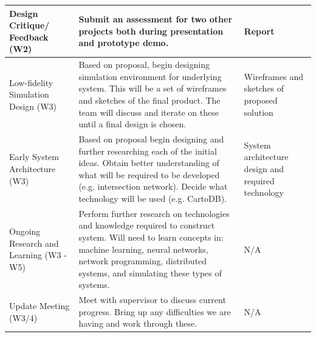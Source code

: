 \documentclass{report}
\begin{document}
\begin{longtable}[htbp] {| P{2.5cm} | P{10cm} | P{2.5cm} |}
    Design Critique/ Feedback (W2)             & Submit an assessment for two other projects both during presentation and prototype demo.                                                                                                                                                                                                                                                                                                   & Report                                             \\ \hline
    Low-fidelity Simulation Design (W3)        & Based on proposal, begin designing simulation environment for underlying system. This will be a set of wireframes and sketches of the final product. The team will discuss and iterate on these until a final design is chosen.                                                                                                                                                             & Wireframes and sketches of proposed solution       \\ \hline
    Early System Architecture (W3)             & Based on proposal begin designing and further researching each of the initial ideas. Obtain better understanding of what will be required to be developed (e.g. intersection network). Decide what technology will be used (e.g. CartoDB).                                                                                                                                                 & System architecture design and required technology \\ \hline
    Ongoing Research and Learning (W3 - W5)    & Perform further research on technologies and knowledge required to construct system. Will need to learn concepts in: machine learning, neural networks, network programming, distributed systems, and simulating these types of systems.                                                                                                                                                   & N/A                                                \\ \hline
    Update Meeting (W3/4)                      & Meet with supervisor to discuss current progress. Bring up any difficulties we are having and work through these.                                                                                                                                                                                                                                                                          & N/A                                                \\ \hline

\end{longtable}
\end{document}
